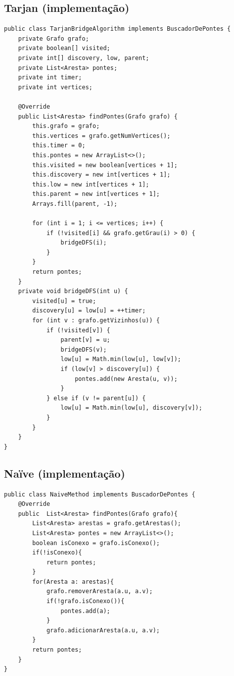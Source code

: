\documentclass[12pt]{article}
\begin{document}
\subsection{Tarjan (implementação)}
\begin{lstlisting}
public class TarjanBridgeAlgorithm implements BuscadorDePontes {
    private Grafo grafo;
    private boolean[] visited;
    private int[] discovery, low, parent;
    private List<Aresta> pontes;
    private int timer;
    private int vertices;

    @Override
    public List<Aresta> findPontes(Grafo grafo) {
        this.grafo = grafo;
        this.vertices = grafo.getNumVertices();
        this.timer = 0;
        this.pontes = new ArrayList<>();
        this.visited = new boolean[vertices + 1];
        this.discovery = new int[vertices + 1];
        this.low = new int[vertices + 1];
        this.parent = new int[vertices + 1];
        Arrays.fill(parent, -1);

        for (int i = 1; i <= vertices; i++) {
            if (!visited[i] && grafo.getGrau(i) > 0) {
                bridgeDFS(i);
            }
        }
        return pontes;
    }
    private void bridgeDFS(int u) {
        visited[u] = true;
        discovery[u] = low[u] = ++timer;
        for (int v : grafo.getVizinhos(u)) {
            if (!visited[v]) {
                parent[v] = u;
                bridgeDFS(v);
                low[u] = Math.min(low[u], low[v]);
                if (low[v] > discovery[u]) {
                    pontes.add(new Aresta(u, v));
                }
            } else if (v != parent[u]) {
                low[u] = Math.min(low[u], discovery[v]);
            }
        }
    }
}
\end{lstlisting}

\subsection{Naïve (implementação)}
\begin{lstlisting}
public class NaiveMethod implements BuscadorDePontes {
    @Override
    public  List<Aresta> findPontes(Grafo grafo){
        List<Aresta> arestas = grafo.getArestas();
        List<Aresta> pontes = new ArrayList<>(); 
        boolean isConexo = grafo.isConexo();
        if(!isConexo){
            return pontes;
        }
        for(Aresta a: arestas){
            grafo.removerAresta(a.u, a.v);
            if(!grafo.isConexo()){
                pontes.add(a);
            }
            grafo.adicionarAresta(a.u, a.v);
        }
        return pontes;
    }
}
\end{lstlisting}
\end{document}
